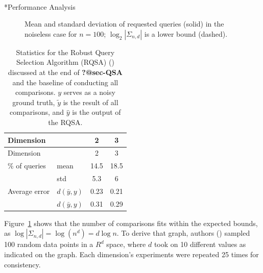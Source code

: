 \documentclass[
  letterpaper,
  numbers=noenddot,
  DIV=11]{scrreprt}
\makeatletter
\let\oldparagraph\paragraph
\renewcommand{\paragraph}{
    \@ifstar
      \xxxParagraphStar
      \xxxParagraphNoStar
  }
\newcommand{\xxxParagraphStar}[1]{\oldparagraph*{#1}\mbox{}}
\newcommand{\xxxParagraphNoStar}[1]{\oldparagraph{#1}\mbox{}}
\theoremstyle{definition}
\theoremstyle{plain}
\theoremstyle{plain}
\theoremstyle{remark}
\makeatother
\begin{document}
\paragraph*{Performance Analysis}\label{sec-QSA}

\begin{figure}


\caption{\label{fig-rand_n}Mean and standard deviation of requested
queries (solid) in the noiseless case for \(n = 100\);
\(\log_2|\Sigma_{n,d}|\) is a lower bound (dashed).}

\end{figure}%

\begin{longtable}[]{@{}llcc@{}}
\caption{Statistics for the Robust Query Selection Algorithm (RQSA)
() discussed at the end of
\textbf{?@sec-QSA} and the baseline of conducting all comparisons. \(y\)
serves as a noisy ground truth, \(\tilde{y}\) is the result of all
comparisons, and \(\hat{y}\) is the output of the
RQSA.}\label{tbl-geo_acc}\tabularnewline
\toprule\noalign{}
Dimension & & 2 & 3 \\
\midrule\noalign{}
\endfirsthead
\toprule\noalign{}
Dimension & & 2 & 3 \\
\midrule\noalign{}
\endhead
\bottomrule\noalign{}
\endlastfoot
\% of queries & mean & 14.5 & 18.5 \\
& std & 5.3 & 6 \\
Average error & \(d(\bar{y}, y)\) & 0.23 & 0.21 \\
& \(d(\bar{y}, y)\) & 0.31 & 0.29 \\
\end{longtable}

Figure~\ref{fig-rand_n} shows that the number of comparisons fits within
the expected bounds, as \(\log|\Sigma_{n,d}| = \log(n^d) = d\log n\). To
derive that graph, authors ()
sampled 100 random data points in a \(R^d\) space, where \(d\) took on
10 different values as indicated on the graph. Each dimension's
experiments were repeated 25 times for consistency.
\end{document}
